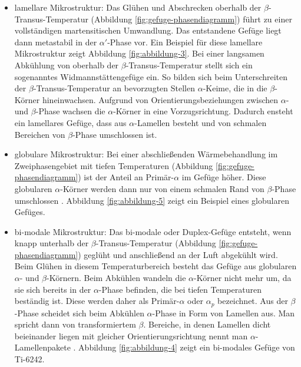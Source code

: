 \begin{itemize} 
	\item lamellare Mikrostruktur: Das Glühen und Abschrecken oberhalb der $\beta$-Transus-Temperatur (Abbildung \ref{fig:gefuge-phasendiagramm}) führt zu einer vollständigen martensitischen Umwandlung. Das entstandene Gefüge liegt dann metastabil in der $\alpha'$-Phase vor. Ein Beispiel für diese lamellare Mikrostruktur zeigt Abbildung \ref{fig:abbildung-3}. Bei einer langsamen Abkühlung von oberhalb der $\beta$-Transus-Temperatur stellt sich ein sogenanntes Widmannstättengefüge ein. So bilden sich beim Unterschreiten der $\beta$-Transus-Temperatur an bevorzugten Stellen $\alpha$-Keime, die in die $\beta$-Körner hineinwachsen. Aufgrund von Orientierungsbeziehungen zwischen $\alpha$- und $\beta$-Phase wachsen die $\alpha$-Körner in eine Vorzugsrichtung. Dadurch ensteht ein lamellares Gefüge, dass aus $\alpha$-Lamellen besteht und von schmalen Bereichen von $\beta$-Phase umschlossen ist.
	
\item globulare Mikrostruktur: Bei einer abschließenden Wärmebehandlung im Zweiphasengebiet mit tiefen Temperaturen (Abbildung \ref{fig:gefuge-phasendiagramm}) ist der Anteil an Primär-$\alpha$ im Gefüge höher. Diese globularen $\alpha$-Körner werden dann nur von einem schmalen Rand von $\beta$-Phase umschlossen \cite{Lutjering.2007}. Abbildung \ref{fig:abbildung-5} zeigt ein Beispiel eines globularen Gefüges.

\item bi-modale Mikrostruktur: Das bi-modale oder Duplex-Gefüge entsteht, wenn knapp unterhalb der $\beta$-Transus-Temperatur (Abbildung \ref{fig:gefuge-phasendiagramm}) geglüht und anschließend an der Luft abgekühlt wird. Beim Glühen in diesem Temperaturbereich besteht das Gefüge aus globularen $\alpha$- und $\beta$-Körnern. Beim Abkühlen wandeln die $\alpha$-Körner nicht mehr um, da sie sich bereits in der $\alpha$-Phase befinden, die bei tiefen Temperaturen beständig ist. Diese werden daher als Primär-$\alpha$ oder $\alpha_p$ bezeichnet. Aus der $\beta$-Phase scheidet sich beim Abkühlen $\alpha$-Phase in Form von Lamellen aus. Man spricht dann von transformiertem $\beta$. Bereiche, in denen Lamellen dicht beieinander liegen mit gleicher Orientierungsrichtung nennt man $\alpha$-Lamellenpakete \cite{Lutjering.2007}. Abbildung \ref{fig:abbildung-4} zeigt ein bi-modales Gefüge von Ti-6242. 


\end{itemize}
